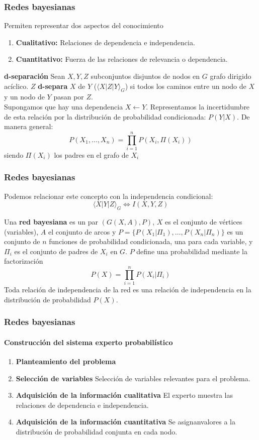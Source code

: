 \documentclass[leqno]{beamer}
\begin{document}
\begin{frame}
\frametitle{Redes bayesianas}
Permiten representar dos aspectos del conocimiento
\begin{enumerate}
\item \textbf{Cualitativo:} Relaciones de dependencia e independencia.
\item \textbf{Cuantitativo:} Fuerza de las relaciones de relevancia o dependencia.
\end{enumerate}

\textbf{d-separación} Sean $X,Y,Z$ subconjuntos disjuntos de nodos en $G$ grafo dirigido acíclico. $Z$ \textbf{d-separa} $X$ de $Y$ ($\langle X|Z|Y \rangle_G$) si todos los caminos entre un nodo de $X$ y un nodo de $Y$ pasan por $Z$.\\

Supongamos que hay una dependencia $X \leftarrow Y$. Representamos la incertidumbre de esta relación por la distribución de probabilidad condicionada: $P(Y|X)$. De manera general:
	\[ P(X_1, \dots,X_n) = \prod\limits_{i=1}^n P(X_i,\Pi(X_i))\]
	siendo $\Pi(X_i)$ los padres en el grafo de $X_i$
\end{frame}


\begin{frame}
\frametitle{Redes bayesianas}
Podemos relacionar este concepto con la independencia condicional:
\[ \langle X|Y|Z \rangle_G \Leftrightarrow I(X,Y,Z) \]

Una \textbf{red bayesiana} es un par $(G(X,A),P)$, $X$ es el conjunto de vértices (variables), $A$ el conjunto de arcos y $P=\{P(X_1|\Pi_1),\dots,P(X_n|\Pi_n)\}$ es un conjunto de $n$ funciones de probabilidad condicionada, una para cada variable, y $\Pi_i$ es el conjunto de padres de $X_i$ en $G$. $P$ define una probabilidad mediante la factorización
\[ P(X) = \prod\limits_{i=1}^n P(X_i|\Pi_i)	\]
Toda relación de independencia de la red es una relación de independencia en la distribución de probabilidad $P(X)$.
\end{frame}

\begin{frame}
\frametitle{Redes bayesianas}
\framesubtitle{Construcción del sistema experto probabilístico}

\begin{enumerate}
\item \textbf{Planteamiento del problema}
\item \textbf{Selección de variables} Selección de variables relevantes para el problema.
\item \textbf{Adquisición de la información cualitativa} El experto muestra las relaciones de dependencia e independencia.
\item \textbf{Adquisición de la información cuantitativa} Se asignanvalores a la distribución de probabilidad conjunta en cada nodo. 
\end{enumerate}
\end{frame}
\end{document}
